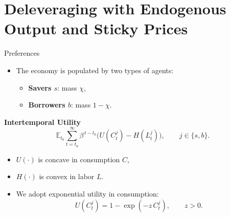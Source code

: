 \documentclass[11pt,aspectratio=169]{beamer}
\newcommand{\E}{\mathbb{E}}
\begin{document}
\section{Deleveraging with Endogenous Output and Sticky Prices}
\begin{frame}{Preferences}
\small
\begin{itemize}
  \item The economy is populated by two types of agents:
  \begin{itemize}
    \item \textbf{Savers $s$}: mass $\chi$,
    \item \textbf{Borrowers $b$}: mass $1-\chi$.
  \end{itemize}
  \vspace{0.4em}
\end{itemize}
\textbf{Intertemporal Utility}
  \begin{equation}
    \E_{t_0}\sum_{t=t_0}^\infty \beta^{\,t-t_0}\Big(U(C_t^j)-H(L_t^j)\Big), \qquad j\in\{s,b\}.
    \label{eq4}
  \end{equation}
\begin{itemize}
    \item $U(\cdot)$ is concave in consumption $C$,
    \item $H(\cdot)$ is convex in labor $L$.
  \item We adopt exponential utility in consumption:
  \begin{equation*}
    U(C_t^j)=1-\exp(-z\,C_t^j), \qquad z>0.
  \end{equation*}
\end{itemize}
\end{frame}
\end{document}
